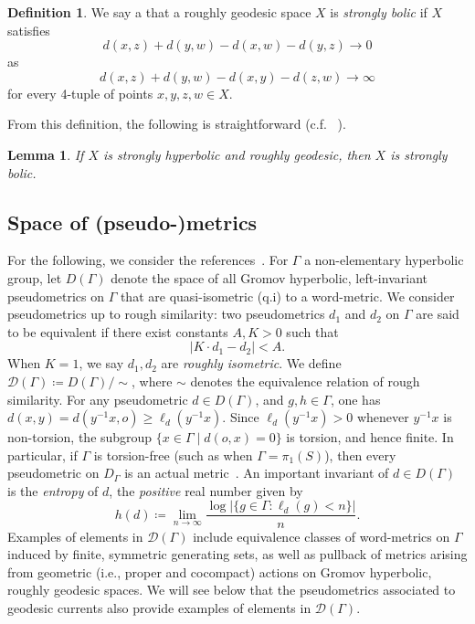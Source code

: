 \documentclass[12pt]{amsart}
\numberwithin{equation}{section}
\numberwithin{figure}{section}
\newtheorem{lemma}[equation]{Lemma}
\theoremstyle{definition}
\newtheorem{definition}[equation]{Definition}
\theoremstyle{plain}
\begin{document}
\begin{definition}
We say a that a roughly geodesic space $X$ is \emph{strongly bolic} if $X$ satisfies 
\[
d(x,z) + d(y,w)-d(x,w)-d(y,z) \to 0
\]
as
\[
d(x,z) + d(y,w)-d(x,y)-d(z,w) \to \infty
\]
for every 4-tuple of points $x,y,z,w \in X$.
\label{def:strong_bolicity}
\end{definition}

From this definition, the following is straightforward (c.f. ~\cite[Theorem~1.1]{NicaSpakula2016}).

\begin{lemma} If $X$ is strongly hyperbolic and roughly geodesic, then $X$ is strongly bolic.
\label{lem:sh_implies_sb}
\end{lemma}

\subsection{Space of (pseudo-)metrics} 
\label{subsec:pseudo_metrics_space}
For the following, we consider the references~\cite{Fur02:Coarse,OR22:SpaceMetric,R23:Thesis}.
For $\Gamma$ a non-elementary hyperbolic group, let $D(\Gamma)$ denote the space of all Gromov hyperbolic, left-invariant pseudometrics on $\Gamma$ that are quasi-isometric (q.i) to a word-metric. We consider pseudometrics up to rough similarity: two pseudometrics $d_1$ and $d_2$ on $\Gamma$ are said to be equivalent if there exist constants $A,K>0$ such that
\[
|K \cdot d_1 - d_2|<A.
\]
When $K=1$, we say $d_1,d_2$ are \emph{roughly isometric}.
We define $\mathcal{D}(\Gamma) \coloneqq D(\Gamma)/\sim$, where $\sim$ denotes the equivalence relation of rough similarity.
For any pseudometric $d \in D(\Gamma)$, and $g,h \in \Gamma$,
one has $d(x,y)=d(y^{-1}x,o) \geq \ell_d(y^{-1}x)$.
Since $\ell_d(y^{-1}x) >0$ whenever $y^{-1}x$ is non-torsion, the 
subgroup $\{ x \in \Gamma \mid d(o,x)=0\}$ is torsion, and hence
finite. In particular, if $\Gamma$ is torsion-free (such as when
$\Gamma=\pi_1(S)$), then every pseudometric on $D_\Gamma$ is an actual metric~\cite[Remark~4.1.3]{R23:Thesis}. An important invariant of $d \in D(\Gamma)$ is the \emph{entropy} of $d$, the \emph{positive} real number given by
\begin{equation}
h(d) \coloneqq \lim_{n \to \infty} \frac{\log |\{g \in \Gamma : \ell_d(g)<n\}|}{n}.
\label{eq:entropy_d}
\end{equation}
Examples of elements in $\mathcal{D}(\Gamma)$ include equivalence classes of word-metrics on $\Gamma$ induced by finite, symmetric generating sets, as well as pullback of metrics arising from geometric (i.e., proper and cocompact) actions on Gromov hyperbolic, roughly geodesic spaces. We will see below that the pseudometrics associated to geodesic currents also provide examples of elements in $\mathcal{D}(\Gamma)$.
\end{document}
